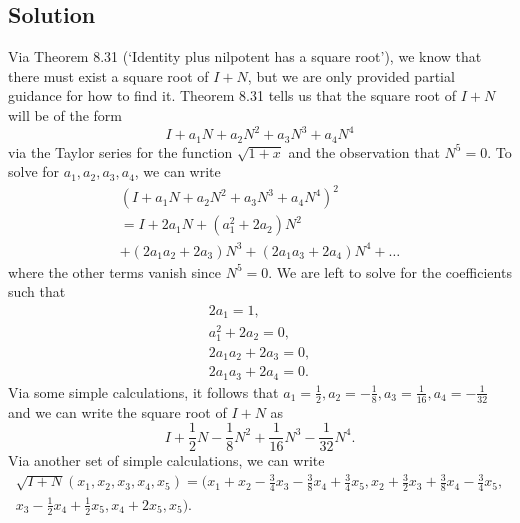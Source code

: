 \documentclass{article}
\begin{document}
\subsection*{Solution}
Via Theorem 8.31 (`Identity plus nilpotent has a square root'), we know that there must exist a square root of $I+N$, but we are only provided partial guidance for how to find it. 
Theorem 8.31 tells us that the square root of $I+N$ will be of the form
\[I+a_1N+a_2N^2+a_3N^3+a_4N^4\]
via the Taylor series for the function $\sqrt{1+x}$ and the observation that $N^5=0$. 
To solve for $a_1,a_2,a_3,a_4$, we can write
\begin{multline*}
    (I+a_1N+a_2N^2+a_3N^3+a_4N^4)^2\\
    = I + 2a_1N + (a_1^2 + 2a_2)N^2\\
    + (2a_1a_2 + 2a_3)N^3 + (2a_1a_3 + 2a_4)N^4 +\ldots
\end{multline*}
where the other terms vanish since $N^5=0$. 
We are left to solve for the coefficients such that 
\begin{gather*} 
    2a_1=1,\\
    a_1^2 + 2a_2=0,\\
    2a_1a_2 + 2a_3=0,\\
    2a_1a_3 + 2a_4=0.
\end{gather*}
Via some simple calculations, it follows that $a_1=\frac{1}{2},a_2=-\frac{1}{8},a_3=\frac{1}{16},a_4=-\frac{1}{32}$ and we can write the square root of $I+N$ as
\[I+\frac{1}{2}N-\frac{1}{8}N^2+\frac{1}{16}N^3-\frac{1}{32}N^4.\]
Via another set of simple calculations, we can write
\begin{multline*}
    \sqrt{I+N}(x_1,x_2,x_3,x_4,x_5)=(x_1+x_2-\frac{3}{4}x_3-\frac{3}{8}x_4+\frac{3}{4}x_5,x_2+\frac{3}{2}x_3+\frac{3}{8}x_4-\frac{3}{4}x_5,\\
    x_3-\frac{1}{2}x_4+\frac{1}{2}x_5,x_4+2x_5,x_5).
\end{multline*}
\end{document}
